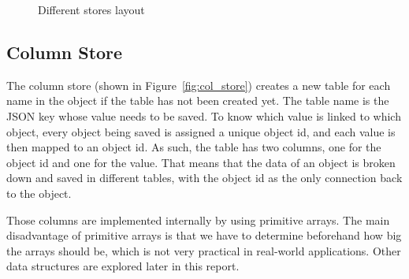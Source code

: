 \documentclass[11pt,journal,compsoc]{IEEEtran}
\begin{document}
\begin{figure}
\captionsetup{justification=centering}
\centerline{
\hfill
{}
\hfill
{}}
\caption{Different stores layout}
\label{fig:stores}
\end{figure} 


\subsection{Column Store}
The column store (shown in Figure~\ref{fig:col_store}) creates a new table for each name in the object if the table has not been created yet. The table name is the JSON key whose value needs to be saved. To know which value is linked to which object, every object being saved is assigned a unique object id, and each value is then mapped to an object id. As such, the table has two columns, one for the object id and one for the value. That means that the data of an object is broken down and saved in different tables, with the object id as the only connection back to the object.

Those columns are implemented internally by using primitive arrays. The main disadvantage of primitive arrays is that we have to determine beforehand how big the arrays should be, which is not very practical in real-world applications. Other data structures are explored later in this report.
\end{document}
